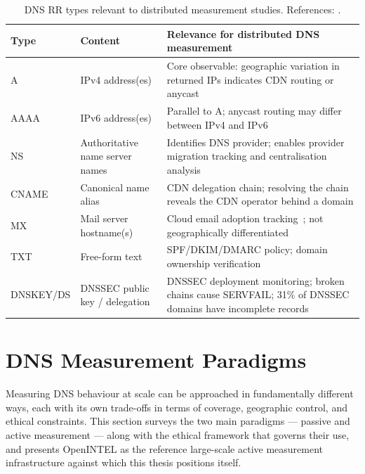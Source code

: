 \begin{table}[H]
\centering
\small
\begin{tabularx}{\linewidth}{p{1.8cm} p{4.1cm} X}
\toprule
\textbf{Type} & \textbf{Content} & \textbf{Relevance for distributed \ac{DNS} measurement} \\
\midrule
\ac{A}     & \ac{IPv4} address(es)                  & Core observable: geographic variation in returned \ac{IP}s indicates \ac{CDN} routing or anycast \\
\ac{AAAA}  & \ac{IPv6} address(es)                  & Parallel to \ac{A}; anycast routing may differ between \ac{IPv4} and \ac{IPv6}~\cite{Bortzmeyer2013} \\
\ac{NS}    & Authoritative name server names   & Identifies \ac{DNS} provider; enables provider migration tracking and centralisation analysis~\cite{Xu2023} \\
\ac{CNAME} & Canonical name alias              & \ac{CDN} delegation chain; resolving the chain reveals the \ac{CDN} operator behind a domain \\
\ac{MX}    & Mail server hostname(s)           & Cloud email adoption tracking~\cite{vanRijswijk2016}; not geographically differentiated \\
\ac{TXT}   & Free-form text                    & \ac{SPF}/\ac{DKIM}/\ac{DMARC} policy; domain ownership verification \\
DNSKEY/DS & \ac{DNSSEC} public key / delegation & \ac{DNSSEC} deployment monitoring; broken chains cause SERVFAIL; 31\% of \ac{DNSSEC} domains have incomplete records~\cite{vanRijswijk2016,Chung2017} \\
\bottomrule
\end{tabularx}
\caption{\ac{DNS} \ac{RR} types relevant to distributed measurement studies. References: \cite{RFC1034,RFC1035}.}
\label{tab:rr_types}
\end{table}

\section{DNS Measurement Paradigms}
\label{sec:2.2}

Measuring \ac{DNS} behaviour at scale can be approached in fundamentally different ways, each with its own trade-offs in terms of coverage, geographic control, and ethical constraints. This section surveys the two main paradigms — passive and active measurement — along with the ethical framework that governs their use, and presents OpenINTEL as the reference large-scale active measurement infrastructure against which this thesis positions itself.

